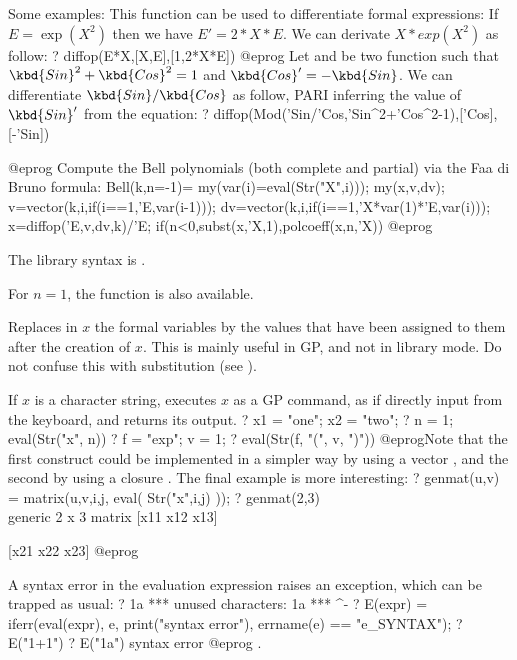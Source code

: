 Some examples:
This function can be used to differentiate formal expressions:
If $E=\exp(X^2)$ then we have $E'=2*X*E$. We can derivate $X*exp(X^2)$ as follow:
\bprog
? diffop(E*X,[X,E],[1,2*X*E])
@eprog
Let  and  be two function such that $\kbd{Sin}^2+\kbd{Cos}^2=1$
and $\kbd{Cos}'=-\kbd{Sin}$. We can differentiate $\kbd{Sin}/\kbd{Cos}$ as follow,
PARI inferring the value of $\kbd{Sin}'$ from the equation:
\bprog
? diffop(Mod('Sin/'Cos,'Sin^2+'Cos^2-1),['Cos],[-'Sin])

@eprog
Compute the Bell polynomials (both complete and partial) via the Faa di Bruno formula:
\bprog
Bell(k,n=-1)=
{
  my(var(i)=eval(Str("X",i)));
  my(x,v,dv);
  v=vector(k,i,if(i==1,'E,var(i-1)));
  dv=vector(k,i,if(i==1,'X*var(1)*'E,var(i)));
  x=diffop('E,v,dv,k)/'E;
  if(n<0,subst(x,'X,1),polcoeff(x,n,'X))
}
@eprog

The library syntax is .

For $n=1$, the function  is also available.

\label{se:eval}
Replaces in $x$ the formal variables by the values that
have been assigned to them after the creation of $x$. This is mainly useful
in GP, and not in library mode. Do not confuse this with substitution (see
).

If $x$ is a character string,  executes $x$ as a GP
command, as if directly input from the keyboard, and returns its
output.
\bprog
? x1 = "one"; x2 = "two";
? n = 1; eval(Str("x", n))
? f = "exp"; v = 1;
? eval(Str(f, "(", v, ")"))
@eprog\noindent Note that the first construct could be implemented in a
simpler way by using a vector , and the second
by using a closure . The final example is more interesting:
\bprog
? genmat(u,v) = matrix(u,v,i,j, eval( Str("x",i,j) ));
? genmat(2,3)   \\ generic 2 x 3 matrix
[x11 x12 x13]

[x21 x22 x23]
@eprog

A syntax error in the evaluation expression raises an 
exception, which can be trapped as usual:
\bprog
? 1a
 ***   unused characters: 1a
 ***                       ^-
? E(expr) =
  {
    iferr(eval(expr),
          e, print("syntax error"),
          errname(e) == "e_SYNTAX");
  }
? E("1+1")
? E("1a")
syntax error
@eprog
.

